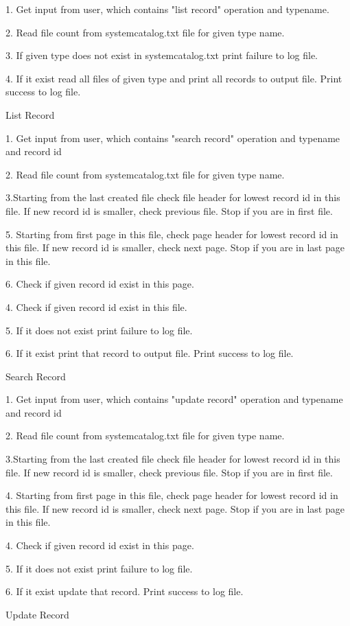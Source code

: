 \documentclass{article}
\begin{document}
\begin{algorithm}[H]
 \item1. Get input from user, which contains "list record" operation and typename.
 \item2. Read file count from systemcatalog.txt file for given type name.
 \item 3. If given type does not exist in systemcatalog.txt print failure to log file.
 \item 4. If it exist read all files of given type and print all records to output file. Print success to log file.
\caption{List Record}
\end{algorithm}

\begin{algorithm}[H]
 \item1. Get input from user, which contains "search record" operation and typename and record id
 \item2. Read file count from systemcatalog.txt file for given type name.
 \item 3.Starting from the last created file check file header for lowest record id in this file. If new record id is smaller, check previous file. Stop if you are in first file.
 \item 5. Starting from first page in this file, check page header for lowest record id in this file. If new record id is smaller, check next page. Stop if you are in last page in this file. 
 \item 6. Check if given record id exist in this page.
 \item 4. Check if given record id exist in this file.
 \item 5. If it does not exist print failure to log file. 
 \item 6. If it exist print that record to output file. Print success to log file.
\caption{Search Record}
\end{algorithm}

\begin{algorithm}[H]
 \item1. Get input from user, which contains "update record" operation and typename and record id
 \item2. Read file count from systemcatalog.txt file for given type name.
 \item 3.Starting from the last created file check file header for lowest record id in this file. If new record id is smaller, check previous file. Stop if you are in first file.
 \item 4. Starting from first page in this file, check page header for lowest record id in this file. If new record id is smaller, check next page. Stop if you are in last page in this file. 
 \item 4. Check if given record id exist in this page.
 \item 5. If it does not exist print failure to log file. 
 \item 6. If it exist update that record. Print success to log file.
\caption{Update Record}
\end{algorithm}
\end{document}
